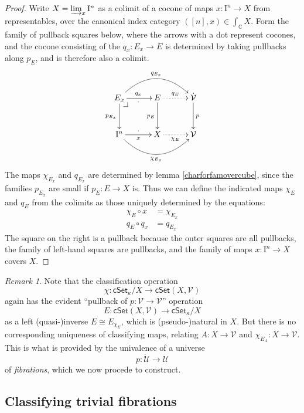 \documentclass[11pt]{article}
\makeatletter
\newcommand{\C}{\ensuremath{\mathbb{C}}}
\newcommand{\cSet}{\ensuremath{\mathsf{cSet}}}
\newcommand{\pbcorner}[1][dr]{\save*!/#1-1.2pc/#1:(-1,1)@^{|-}\restore}
\newcommand{\ra}{\ensuremath{\rightarrow}}
\newcommand{\I}{\ensuremath{\mathrm{I}}}
\newcommand{\U}{\ensuremath{\mathcal{U}}}
\newcommand{\UU}{\ensuremath{\dot{\mathcal{U}}}}
\newcommand{\V}{\ensuremath{\mathcal{V}}}
\newcommand{\VV}{\ensuremath{\dot{\mathcal{V}}}}
\theoremstyle{remark}
\newtheorem{remark}[theorem]{Remark}
\theoremstyle{definition}
\makeatother
\begin{document}
\begin{proof}
Write $X = \varinjlim_{x} \I^n$ as a colimit of a cocone of maps $ x : \I^n \ra X$ from representables, over the canonical index category $([n],x) \in \int_\C X$.  Form the family of pullback squares below, where the arrows with a dot represent cocones, and the cocone consisting of the $q_x : E_x \ra E$  is determined by taking pullbacks along $p_E$, and is therefore also a colimit. 
\begin{equation}\label{diagram:U7}
\xymatrix@=3em{
E_x \ar[d]_{p_{E_x}} \ar[r]_{\cdot}^{q_x} \ar@/^2.0pc/[rr]^{q_{E_x}} \pbcorner & E \ar[d]_{p_{E}} \ar@{..>}[r]^{q_E} & \VV\ar[d]^{p}  \\
\I^n \ar@/_2.0pc/[rr]_{\chi_{E_x}}  \ar[r]^{\cdot}_x & X \ar@{..>}[r]_{\chi_E} & \V
}
\end{equation}
The maps $\chi_{E_x}$  and $q_{E_x}$ are determined by lemma \ref{charforfamovercube}, since the families $p_{E_x}$ are small if $p_E: E \ra X$ is.  Thus we can define the indicated maps $\chi_E$ and $q_E$ from the colimits as those uniquely determined by the equations:
\begin{align}\label{eqns:U}
\chi_E \circ x &= \chi_{E_x}\\
q_E \circ q_{x} &= q_{E_x}
\end{align}
The square on the right is a pullback because the outer squares are all pullbacks,  the family of left-hand squares are pullbacks, and the family of maps $x : \I^n \ra X$ covers $X$.
\end{proof}

\begin{remark} 
Note that the classification operation $$\chi : \cSet_\kappa/X \to \cSet(X, \V)$$ again has the evident ``pullback of $p : \VV\ra\V$'' operation 
$$E : \cSet(X, \V) \to \cSet_\kappa/X $$ as a left (quasi-)inverse $
E \cong E_{\chi_E}$, which is (pseudo-)natural in $X$. 
But there is no corresponding uniqueness of classifying maps, relating $A : X\ra \V$ and $\chi_{E_A} : X\ra\V$.  This is what is provided by the univalence of a universe $$p : \UU\ra\U$$ of \emph{fibrations}, which we now procede to construct.
\end{remark}

\subsection{Classifying trivial fibrations}
\end{document}
